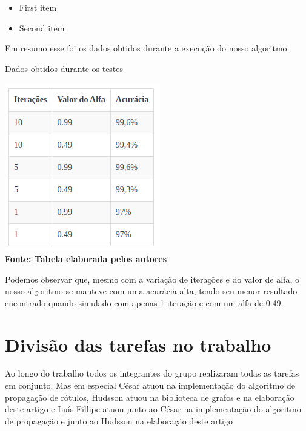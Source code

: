 \documentclass[12pt]{article}
\begin{document}
\begin{itemize}
\color{white}
\item First item
\item Second item
\end{itemize}
\newpage
Em resumo esse foi os dados obtidos durante a execução do nosso algoritmo:
\begin{table}[ht]
\centering
\caption{Dados obtidos durante os testes}
\label{tab:exTable1}
\includegraphics[width=.45\textwidth]{tabela.png}
\\\textbf{\footnotesize  Fonte: Tabela elaborada pelos autores }
\end{table}

Podemos observar que, mesmo com a variação de iterações e do valor de alfa, o nosso algoritmo se manteve com uma acurácia alta, tendo seu menor resultado encontrado quando simulado com apenas 1 iteração e com um alfa de 0.49.

\section{Divisão das tarefas no trabalho}
Ao longo do trabalho todos os integrantes do grupo realizaram todas as tarefas em conjunto. Mas em especial César atuou na implementação do algoritmo de propagação de rótulos, Hudsson atuou na biblioteca de grafos e na elaboração deste artigo e Luís Fillipe atuou junto ao César na implementação do algoritmo de propagação e junto ao Hudsson na elaboração deste artigo
\newpage\newpage


\end{document}
